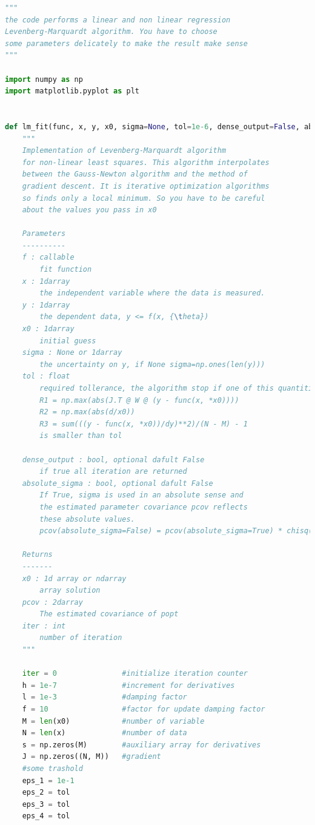 \documentclass[10pt,a4paper]{article}
\begin{document}
\begin{lstlisting}[language=Python]
"""
the code performs a linear and non linear regression
Levenberg-Marquardt algorithm. You have to choose
some parameters delicately to make the result make sense
"""

import numpy as np
import matplotlib.pyplot as plt


def lm_fit(func, x, y, x0, sigma=None, tol=1e-6, dense_output=False, absolute_sigma=False):
    """
    Implementation of Levenberg-Marquardt algorithm
    for non-linear least squares. This algorithm interpolates
    between the Gauss-Newton algorithm and the method of
    gradient descent. It is iterative optimization algorithms
    so finds only a local minimum. So you have to be careful
    about the values you pass in x0

    Parameters
    ----------
    f : callable
        fit function
    x : 1darray
        the independent variable where the data is measured.
    y : 1darray
        the dependent data, y <= f(x, {\theta})
    x0 : 1darray
        initial guess
    sigma : None or 1darray
        the uncertainty on y, if None sigma=np.ones(len(y)))
    tol : float
        required tollerance, the algorithm stop if one of this quantities
        R1 = np.max(abs(J.T @ W @ (y - func(x, *x0))))
        R2 = np.max(abs(d/x0))
        R3 = sum(((y - func(x, *x0))/dy)**2)/(N - M) - 1
        is smaller than tol
        
    dense_output : bool, optional dafult False
        if true all iteration are returned
    absolute_sigma : bool, optional dafult False
        If True, sigma is used in an absolute sense and
        the estimated parameter covariance pcov reflects
        these absolute values.
        pcov(absolute_sigma=False) = pcov(absolute_sigma=True) * chisq(popt)/(M-N)

    Returns
    -------
    x0 : 1d array or ndarray
        array solution
    pcov : 2darray
        The estimated covariance of popt
    iter : int
        number of iteration
    """

    iter = 0               #initialize iteration counter
    h = 1e-7               #increment for derivatives
    l = 1e-3               #damping factor
    f = 10                 #factor for update damping factor
    M = len(x0)            #number of variable
    N = len(x)             #number of data
    s = np.zeros(M)        #auxiliary array for derivatives
    J = np.zeros((N, M))   #gradient
    #some trashold
    eps_1 = 1e-1 
    eps_2 = tol
    eps_3 = tol
    eps_4 = tol


\end{lstlisting}
\end{document}
